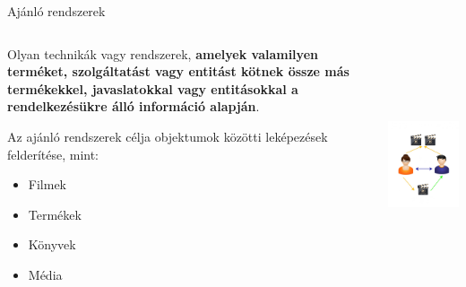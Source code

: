 \documentclass[english, aspectratio=169]{beamer}
\begin{document}
\begin{frame}{Ajánló rendszerek}
\begin{columns}
\begin{column}{.5\textwidth}
Olyan technikák vagy rendszerek, \textbf{amelyek valamilyen terméket, szolgáltatást vagy entitást kötnek össze más termékekkel, javaslatokkal vagy entitásokkal a rendelkezésükre álló információ alapján}.\par\smallskip
Az ajánló rendszerek célja objektumok közötti leképezések felderítése, mint: 
\begin{itemize}
	\item Filmek
	\item Termékek
	\item Könyvek
	\item Média
\end{itemize}
\end{column}
\begin{column}{.5\textwidth}
\begin{center}
\includegraphics[width=7cm, height=7cm, keepaspectratio]{images/recommender_2.png}
\end{center}
\end{column}
\end{columns}
\end{frame}
\end{document}
